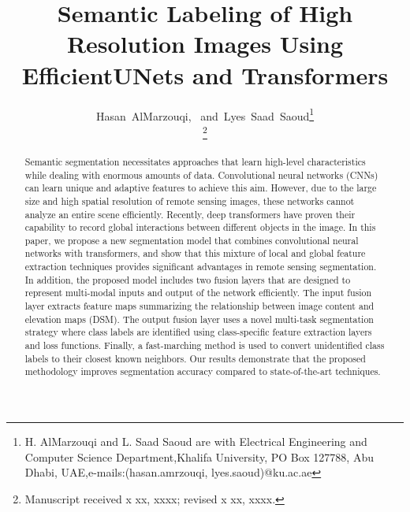 \documentclass[journal]{IEEEtran}
\begin{document}
\title{Semantic Labeling of High Resolution Images Using EfficientUNets and Transformers}


\author{Hasan~AlMarzouqi,~
        and~Lyes~Saad~Saoud\thanks{H. AlMarzouqi and L. Saad Saoud are with Electrical Engineering and Computer Science Department,Khalifa University, PO Box 127788, Abu Dhabi, UAE,e-mails:(hasan.amrzouqi, lyes.saoud)@ku.ac.ae}

\thanks{Manuscript received x xx, xxxx; revised x  xx, xxxx.}}



















\maketitle

\begin{abstract}
Semantic segmentation necessitates approaches that learn high-level characteristics while dealing with enormous amounts of data. Convolutional neural networks (CNNs) can learn unique and adaptive features to achieve this aim. However, due to the large size and high spatial resolution of remote sensing images, these networks cannot analyze an entire scene efficiently. Recently, deep transformers have proven their capability to record global interactions between different objects in the image. In this paper, we propose a new segmentation model that combines convolutional neural networks with transformers, and show that this mixture of local and global feature extraction techniques provides significant advantages in remote sensing segmentation. In addition, the proposed model includes two fusion layers that are designed to represent multi-modal inputs and output of the network efficiently. The input fusion layer extracts feature maps summarizing the relationship between image content and elevation maps (DSM). The output fusion layer uses a novel multi-task segmentation strategy where class labels are identified using class-specific feature extraction layers and loss functions. Finally, a fast-marching method is used to convert unidentified class labels to their closest known neighbors. Our results demonstrate that the proposed methodology improves segmentation accuracy compared to state-of-the-art techniques.
\end{abstract}
\end{document}
